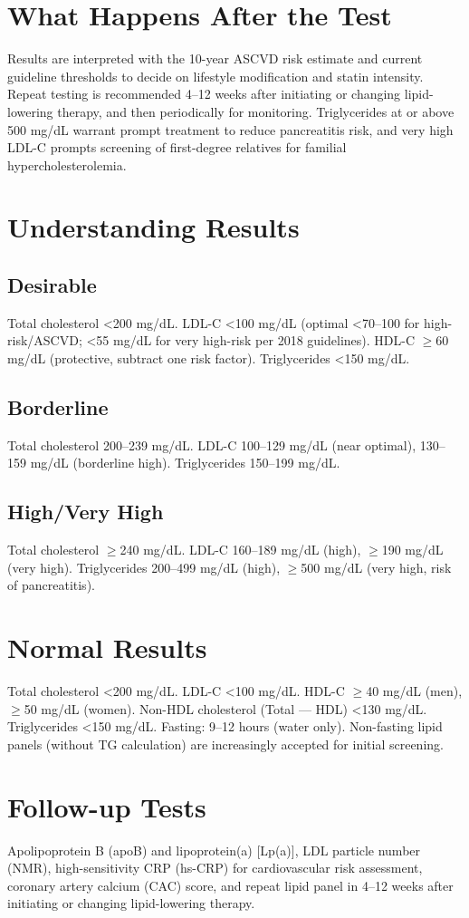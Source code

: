 \section*{What Happens After the Test}
Results are interpreted with the 10-year ASCVD risk estimate and current guideline thresholds to decide on lifestyle modification and statin intensity. Repeat testing is recommended 4--12 weeks after initiating or changing lipid-lowering therapy, and then periodically for monitoring. Triglycerides at or above 500 mg/dL warrant prompt treatment to reduce pancreatitis risk, and very high LDL-C prompts screening of first-degree relatives for familial hypercholesterolemia.
\section*{Understanding Results}
\subsection*{Desirable}
Total cholesterol <200 mg/dL. LDL-C <100 mg/dL (optimal <70--100 for high-risk/ASCVD; <55 mg/dL for very high-risk per 2018 guidelines). HDL-C $\geq$60 mg/dL (protective, subtract one risk factor). Triglycerides <150 mg/dL.
\subsection*{Borderline}
Total cholesterol 200--239 mg/dL. LDL-C 100--129 mg/dL (near optimal), 130--159 mg/dL (borderline high). Triglycerides 150--199 mg/dL.
\subsection*{High/Very High}
Total cholesterol $\geq$240 mg/dL. LDL-C 160--189 mg/dL (high), $\geq$190 mg/dL (very high). Triglycerides 200--499 mg/dL (high), $\geq$500 mg/dL (very high, risk of pancreatitis).
\section*{Normal Results}
Total cholesterol <200 mg/dL. LDL-C <100 mg/dL. HDL-C $\geq$40 mg/dL (men), $\geq$50 mg/dL (women). Non-HDL cholesterol (Total --- HDL) <130 mg/dL. Triglycerides <150 mg/dL. Fasting: 9--12 hours (water only). Non-fasting lipid panels (without TG calculation) are increasingly accepted for initial screening.
\section*{Follow-up Tests}
Apolipoprotein B (apoB) and lipoprotein(a) [Lp(a)], LDL particle number (NMR), high-sensitivity CRP (hs-CRP) for cardiovascular risk assessment, coronary artery calcium (CAC) score, and repeat lipid panel in 4--12 weeks after initiating or changing lipid-lowering therapy.
